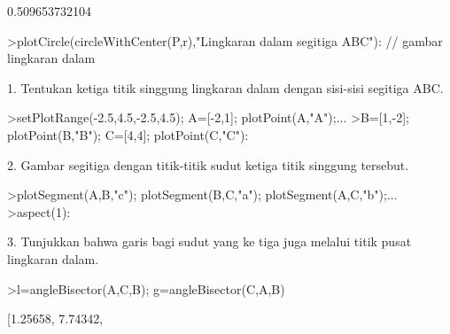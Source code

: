 \documentclass[a4paper,10pt]{article}
\begin{document}
\begin{eulernotebook}
\begin{eulercomment}
\begin{eulercomment}
\begin{eulercomment}
\begin{eulercomment}
\begin{eulercomment}
\begin{eulercomment}
\begin{eulercomment}
\begin{eulercomment}
\begin{eulercomment}
\begin{eulercomment}
\begin{eulercomment}
\begin{eulercomment}
\begin{eulercomment}
\begin{eulercomment}
\begin{eulercomment}
\begin{eulercomment}
\begin{eulercomment}
\begin{eulercomment}
\begin{eulercomment}
\begin{eulercomment}
\begin{eulercomment}
\begin{eulercomment}
\begin{eulercomment}
\begin{eulercomment}
\begin{eulercomment}
\begin{eulercomment}
\begin{eulercomment}
\begin{eulercomment}
\begin{eulercomment}
\begin{eulercomment}
\begin{eulercomment}
\begin{eulercomment}
\begin{eulercomment}
\begin{eulercomment}
\begin{eulercomment}
\begin{eulercomment}
\begin{eulercomment}
\begin{eulercomment}
\begin{eulercomment}
\begin{eulercomment}
\begin{eulercomment}
\begin{eulercomment}
\begin{eulercomment}
\begin{eulercomment}
\begin{eulercomment}
\begin{eulercomment}
\begin{eulercomment}
\begin{eulercomment}
\begin{eulercomment}
\begin{eulercomment}
\begin{eulercomment}
\begin{eulercomment}
\begin{eulercomment}
\begin{eulercomment}
\begin{eulercomment}
\begin{eulercomment}
\begin{eulercomment}
\begin{eulercomment}
\begin{eulercomment}
\begin{eulercomment}
\begin{eulercomment}
\begin{eulercomment}
\begin{euleroutput}
0.509653732104
\end{euleroutput}
\begin{eulerprompt}
>plotCircle(circleWithCenter(P,r),"Lingkaran dalam segitiga ABC"): // gambar lingkaran dalam
\end{eulerprompt}
\begin{eulercomment}
1. Tentukan ketiga titik singgung lingkaran dalam dengan sisi-sisi
segitiga ABC.
\end{eulercomment}
\begin{eulerprompt}
>setPlotRange(-2.5,4.5,-2.5,4.5); A=[-2,1]; plotPoint(A,"A");...
>B=[1,-2]; plotPoint(B,"B"); C=[4,4]; plotPoint(C,"C"):
\end{eulerprompt}
\begin{eulercomment}
2. Gambar segitiga dengan titik-titik sudut ketiga titik singgung
tersebut.
\end{eulercomment}
\begin{eulerprompt}
>plotSegment(A,B,"c"); plotSegment(B,C,"a"); plotSegment(A,C,"b");...
>aspect(1):
\end{eulerprompt}
\begin{eulercomment}
3. Tunjukkan bahwa garis bagi sudut yang ke tiga juga melalui titik
pusat lingkaran dalam.
\end{eulercomment}
\begin{eulerprompt}
>l=angleBisector(A,C,B); g=angleBisector(C,A,B) 
\end{eulerprompt}
\begin{euleroutput}
  [1.25658,  7.74342,  
\end{euleroutput}
\end{eulercomment}
\end{eulercomment}
\end{eulercomment}
\end{eulercomment}
\end{eulercomment}
\end{eulercomment}
\end{eulercomment}
\end{eulercomment}
\end{eulercomment}
\end{eulercomment}
\end{eulercomment}
\end{eulercomment}
\end{eulercomment}
\end{eulercomment}
\end{eulercomment}
\end{eulercomment}
\end{eulercomment}
\end{eulercomment}
\end{eulercomment}
\end{eulercomment}
\end{eulercomment}
\end{eulercomment}
\end{eulercomment}
\end{eulercomment}
\end{eulercomment}
\end{eulercomment}
\end{eulercomment}
\end{eulercomment}
\end{eulercomment}
\end{eulercomment}
\end{eulercomment}
\end{eulercomment}
\end{eulercomment}
\end{eulercomment}
\end{eulercomment}
\end{eulercomment}
\end{eulercomment}
\end{eulercomment}
\end{eulercomment}
\end{eulercomment}
\end{eulercomment}
\end{eulercomment}
\end{eulercomment}
\end{eulercomment}
\end{eulercomment}
\end{eulercomment}
\end{eulercomment}
\end{eulercomment}
\end{eulercomment}
\end{eulercomment}
\end{eulercomment}
\end{eulercomment}
\end{eulercomment}
\end{eulercomment}
\end{eulercomment}
\end{eulercomment}
\end{eulercomment}
\end{eulercomment}
\end{eulercomment}
\end{eulercomment}
\end{eulercomment}
\end{eulercomment}
\end{eulernotebook}
\end{document}
